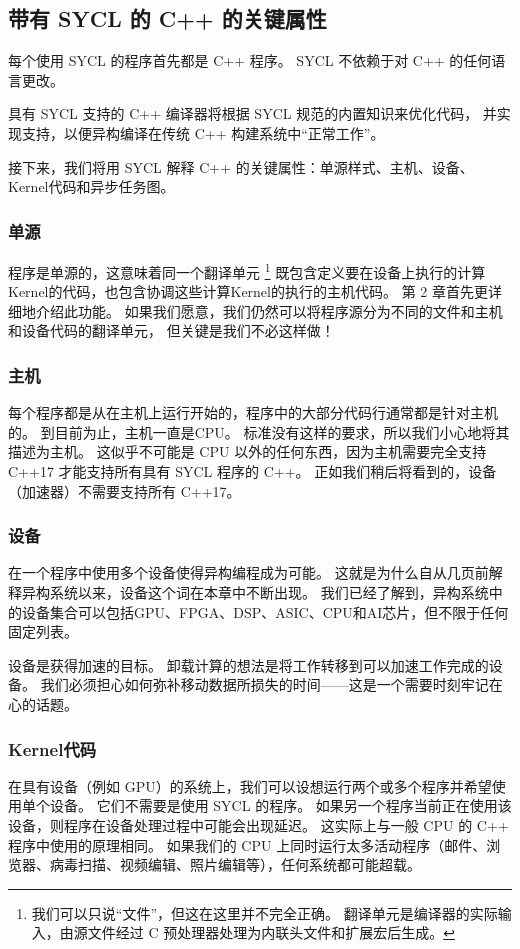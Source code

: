 \subsection{带有 SYCL 的 C++ 的关键属性}
每个使用 SYCL 的程序首先都是 C++ 程序。 SYCL 不依赖于对 C++ 的任何语言更改。

具有 SYCL 支持的 C++ 编译器将根据 SYCL 规范的内置知识来优化代码，
并实现支持，以便异构编译在传统 C++ 构建系统中“正常工作”。

接下来，我们将用 SYCL 解释 C++ 的关键属性：单源样式、主机、设备、Kernel代码和异步任务图。

\subsubsection{单源}
程序是单源的，这意味着同一个翻译单元 \footnote{我们可以只说“文件”，但这在这里并不完全正确。 
翻译单元是编译器的实际输入，由源文件经过 C 预处理器处理为内联头文件和扩展宏后生成。} 
既包含定义要在设备上执行的计算Kernel的代码，也包含协调这些计算Kernel的执行的主机代码。 
第 2 章首先更详细地介绍此功能。 如果我们愿意，我们仍然可以将程序源分为不同的文件和主机和设备代码的翻译单元，
但关键是我们不必这样做！

\subsubsection{主机}
每个程序都是从在主机上运行开始的，程序中的大部分代码行通常都是针对主机的。 
到目前为止，主机一直是CPU。 标准没有这样的要求，所以我们小心地将其描述为主机。 
这似乎不可能是 CPU 以外的任何东西，因为主机需要完全支持 C++17 才能支持所有具有 SYCL 程序的 C++。 
正如我们稍后将看到的，设备（加速器）不需要支持所有 C++17。

\subsubsection{设备}
在一个程序中使用多个设备使得异构编程成为可能。 这就是为什么自从几页前解释异构系统以来，设备这个词在本章中不断出现。 
我们已经了解到，异构系统中的设备集合可以包括GPU、FPGA、DSP、ASIC、CPU和AI芯片，但不限于任何固定列表。

设备是获得加速的目标。 卸载计算的想法是将工作转移到可以加速工作完成的设备。 
我们必须担心如何弥补移动数据所损失的时间——这是一个需要时刻牢记在心的话题。

\subsubsection{Kernel代码}
在具有设备（例如 GPU）的系统上，我们可以设想运行两个或多个程序并希望使用单个设备。 
它们不需要是使用 SYCL 的程序。 如果另一个程序当前正在使用该设备，则程序在设备处理过程中可能会出现延迟。 
这实际上与一般 CPU 的 C++ 程序中使用的原理相同。 
如果我们的 CPU 上同时运行太多活动程序（邮件、浏览器、病毒扫描、视频编辑、照片编辑等），任何系统都可能超载。

